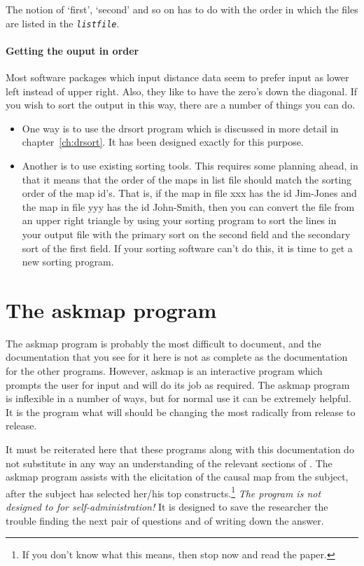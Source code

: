 \documentclass[%
	11pt,
        a4paper,
        twoside]{workrep}
\newcommand*{\prg}[1]{\textsf{#1}}		%
\begin{document}
The notion of `first', `second' and so on has to do with the order
in which the files are listed in the \textit{\tt listfile}.

\subsubsection{Getting the ouput in order}\label{sec:sortdrout}

Most software packages which input distance data seem to prefer input
as lower left instead of upper right.  Also, they like to have the
zero's down the diagonal.
If you wish to sort the output in this way, there are a number
of things you can do.

\begin{itemize}
\item One way is to use the \prg{drsort} program which is discussed
  in more detail in chapter~\ref{ch:drsort}.   It has been designed
  exactly for this purpose.

\item Another is to use existing sorting tools.  This requires some planning
  ahead, in that it means that the order of the maps in list file
  should match the sorting order of the map id's.  That is, if the map
  in file xxx has the id Jim-Jones and the map in file yyy has the id
  John-Smith, then you can convert the file from an upper right
  triangle by using your sorting program to sort the lines in your
  output file with the primary sort on the second field and the
  secondary sort of the first field.  If your sorting software can't do
  this, it is time to get a new sorting program.

\end{itemize}

\chapter{The \prg{askmap} program} \label{ch:askmap}

The \prg{askmap} program is probably the most difficult to document, and
the documentation that you see for it here is not as complete as the
documentation for the other programs.  However, \prg{askmap} is an
interactive program which prompts the user for input and will do its
job as required.  The \prg{askmap} program is inflexible in a number
of ways, but for normal use it can be extremely helpful.  It is the program
what will should be changing the most radically from release to release.

It must be reiterated here that these programs along with this
documentation do not substitute in any way an understanding of
the relevant sections of .
The \prg{askmap} program assists with the elicitation of the
causal map from the subject, after the subject has selected
her/his top constructs.\footnote{%
 If you don't know what this means, then stop now and read
 the paper.}
\emph{The program is not designed to for self-administration!}  It is
designed to save the researcher the trouble finding the next pair
of questions and of writing down the answer.
\end{document}
